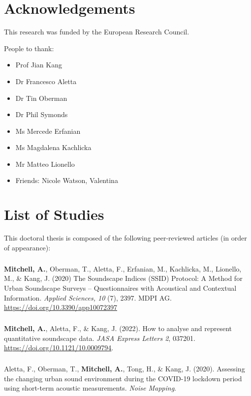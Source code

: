 \documentclass[twoside,fontsize=12pt,titlepage,chapterprefix=true
]{scrbook}
\begin{document}
\chapter*{Acknowledgements}
This research was funded by the European Research Council.

People to thank:
\begin{itemize}
      \item Prof Jian Kang
      \item Dr Francesco Aletta
      \item Dr Tin Oberman
      \item Dr Phil Symonds
      \item Ms Mercede Erfanian
      \item Ms Magdalena Kachlicka
      \item Mr Matteo Lionello
      \item Friends: Nicole Watson, Valentina
\end{itemize}

\chapter*{List of Studies}

This doctoral thesis is composed of the following peer-reviewed articles (in order of appearance):

\paragraph*{}
\textbf{Mitchell, A.}, Oberman, T., Aletta, F., Erfanian, M., Kachlicka, M., Lionello, M., \& Kang, J. (2020) The Soundscape Indices (SSID) Protocol: A Method for Urban Soundscape Surveys -- Questionnaires with Acoustical and Contextual Information. \emph{Applied Sciences, 10} (7), 2397. MDPI AG. \url{https://doi.org/10.3390/app10072397}

\paragraph*{}
\textbf{Mitchell, A.}, Aletta, F., \& Kang, J. (2022). How to analyse and represent quantitative soundscape data. \emph{JASA Express Letters 2}, 037201. \url{https://doi.org/10.1121/10.0009794}.


\paragraph*{}
Aletta, F., Oberman, T., \textbf{Mitchell, A.}, Tong, H., \& Kang, J. (2020). Assessing the changing urban sound environment during the COVID-19 lockdown period using short-term acoustic measurements. \emph{Noise Mapping}.
\end{document}
